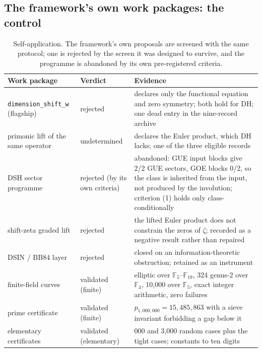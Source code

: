 \documentclass[11pt,a4paper]{article}
\newcommand{\verdict}[1]{\textsf{#1}}
\begin{document}
\subsection{The framework's own work packages: the control}

\begin{table}[t]
\centering
\caption{Self-application. The framework's own proposals are screened with the same protocol;
one is rejected by the screen it was designed to survive, and the programme is abandoned by its own
pre-registered criteria.}
\label{tab:self}
\footnotesize
\begin{tabularx}{\textwidth}{@{}>{\raggedright\arraybackslash}p{4.2cm}>{\raggedright\arraybackslash}p{2.4cm}>{\raggedright\arraybackslash}X@{}}
\toprule
Work package & Verdict & Evidence \\
\midrule
\texttt{dimension\_shift\_w} (flagship) & \verdict{rejected} &
  declares only the functional equation and zero symmetry; both hold for DH; one dead entry in
  the nine-record archive \\
primonic lift of the same operator & \verdict{undetermined} &
  declares the Euler product, which DH lacks; one of the three eligible records \\
DSH sector programme & \verdict{rejected} (by its own criteria) &
  abandoned: GUE input blocks give 2/2 GUE sectors, GOE blocks 0/2, so the class is inherited
  from the input, not produced by the involution; criterion (1) holds only class-conditionally \\
shift-zeta graded lift & \verdict{rejected} &
  the lifted Euler product does not constrain the zeros of $\zeta$; recorded as a negative
  result rather than repaired \\
DSIN / BB84 layer & \verdict{rejected} &
  closed on an information-theoretic obstruction; retained as an instrument \\
finite-field curves & \verdict{validated (finite)} & 942 elliptic over
  $\mathbb{F}_5$--$\mathbb{F}_{19}$, 324 genus-2 over $\mathbb{F}_3$, 10{,}000 over
  $\mathbb{F}_5$, exact integer arithmetic, zero failures \\
prime certificate & \verdict{validated (finite)} & $p_{1{,}000{,}000}=15{,}485{,}863$ with a
  sieve invariant forbidding a gap below it \\
elementary certificates & \verdict{validated (elementary)} & 20{,}000 and 3{,}000 random cases
  plus the tight cases; constants to ten digits \\
\bottomrule
\end{tabularx}
\end{table}
\end{document}
